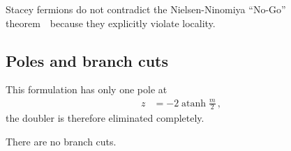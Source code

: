 \documentclass[a4paper]{article}
\DeclareMathOperator{\atanh}{atanh}
\newcommand{\nnt}{Nielsen-Ninomiya ``No-Go'' theorem~\cite{NIELSEN1981219}}
\begin{document}
	Stacey fermions do not contradict the \nnt\ because they explicitly violate locality.
	
	\subsection{Poles and branch cuts}
	This formulation has only one pole at
	\begin{align}
		z &= -2\atanh\frac m2\,,
	\end{align}
	the doubler is therefore eliminated completely.
	
	There are no branch cuts.
	
	\clearpage
	\printbibliography
\end{document}

